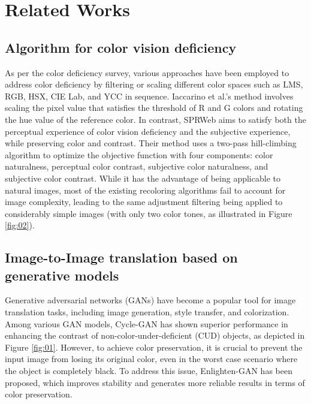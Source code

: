 \section{Related Works}
\subsection{Algorithm for color vision deficiency}
As per the color deficiency survey\cite{RG19a}, various approaches have been employed to address color deficiency by filtering or scaling different color spaces such as LMS, RGB, HSX, CIE Lab, and YCC in sequence. Iaccarino et al.'s method\cite{IMPS06} involves scaling the pixel value that satisfies the threshold of R and G colors and rotating the hue value of the reference color. In contrast, SPRWeb\cite{FRGG13} aims to satisfy both the perceptual experience of color vision deficiency and the subjective experience, while preserving color and contrast. Their method uses a two-pass hill-climbing algorithm to optimize the objective function with four components: color naturalness, perceptual color contrast, subjective color naturalness, and subjective color contrast. While it has the advantage of being applicable to natural images, most of the existing recoloring algorithms fail to account for image complexity, leading to the same adjustment filtering being applied to considerably simple images (with only two color tones, as illustrated in Figure \ref{fig:02}).


\subsection{Image-to-Image translation based on generative models}
Generative adversarial networks (GANs) have become a popular tool for image translation tasks, including image generation, style transfer, and colorization\cite{KWK21, IZZE17}. Among various GAN models, Cycle-GAN\cite{PEZZ20} has shown superior performance in enhancing the contrast of non-color-under-deficient (CUD) objects, as depicted in Figure \ref{fig:01}. However, to achieve color preservation, it is crucial to prevent the input image from losing its original color, even in the worst case scenario where the object is completely black. To address this issue, Enlighten-GAN\cite{JGL*21} has been proposed, which improves stability and generates more reliable results in terms of color preservation. 

